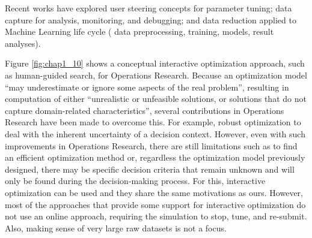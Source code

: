 Recent works \cite{Zhang2017Diagnosing,Re2015Machine,Xin2018Accelerating,souza_provenancedata_2019}
have explored user steering concepts for parameter tuning; data
capture for analysis, monitoring, and debugging; and data reduction
applied to Machine Learning life cycle (\eg{} data preprocessing,
training, models, result analyses).

Figure \ref{fig:chap1_10} \cite{Meignan2015Review}
shows a conceptual interactive optimization approach, such as human-guided
search, for Operations Research. Because an optimization model ``may
underestimate or ignore some aspects of the real problem'', resulting in
computation of either ``unrealistic or unfeasible solutions, or
solutions that do not capture domain-related characteristics'', several
contributions in Operations Research have been made to overcome this.
For example, robust optimization to deal with the inherent uncertainty
of a decision context. However, even with such improvements in
Operations Research, there are still limitations such as to find an
efficient optimization method or, regardless the optimization model
previously designed, there may be specific decision criteria that remain
unknown and will only be found during the decision-making process. For
this, interactive optimization can be used and they share the same
motivations as ours. However, most of the approaches that provide some
support for interactive optimization do not use an online approach,
requiring the simulation to stop, tune, and re-submit. Also, making
sense of very large raw datasets is not a focus.




